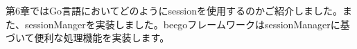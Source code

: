 第6章ではGo言語においてどのようにsessionを使用するのかご紹介しました。また、sessionMangerを実装しました。beegoフレームワークはsessionManagerに基づいて便利な処理機能を実装します。
